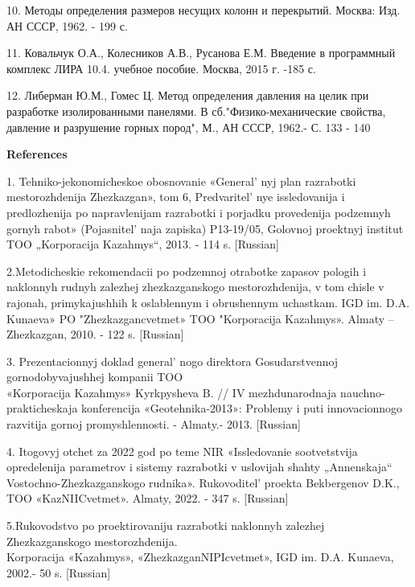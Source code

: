 \begin{references}
10. Методы определения размеров несущих колонн и перекрытий. Москва:
Изд. АН СССР, 1962. - 199 с.

11. Ковальчук О.А., Колесников А.В., Русанова Е.М. Введение в
программный комплекс ЛИРА 10.4. учебное пособие. Москва, 2015 г. -185 с.

12. Либерман Ю.М., Гомес Ц. Метод определения давления на целик при
разработке изолированными панелями. В сб."Физико-механические свойства,
давление и разрушение горных пород", М., АН СССР, 1962.- С. 133 - 140
\end{references}

\begin{center}
{\bfseries References}
\end{center}

\begin{references}

1. Tehniko-jekonomicheskoe obosnovanie «General' nyj plan
razrabotki mestorozhdenija Zhezkazgan», tom 6,
Predvaritel' nye issledovanija i predlozhenija po
napravlenijam razrabotki i porjadku provedenija podzemnyh gornyh rabot»
(Pojasnitel' naja zapiska) P13-19/05, Golovnoj proektnyj
institut TOO „Korporacija Kazahmys``, 2013. - 114 s. {[}Russian{]}

2.Metodicheskie rekomendacii po podzemnoj otrabotke zapasov pologih i
naklonnyh rudnyh zalezhej zhezkazganskogo mestorozhdenija, v tom chisle
v rajonah, primykajushhih k oslablennym i obrushennym uchastkam. IGD im.
D.A. Kunaeva» PO "Zhezkazgancvetmet» TOO "Korporacija Kazahmys». Almaty
-- Zhezkazgan, 2010. - 122 s. {[}Russian{]}

3. Prezentacionnyj doklad general' nogo direktora
Gosudarstvennoj gornodobyvajushhej kompanii TOO \\«Korporacija Kazahmys»
Kyrkpysheva B. // IV mezhdunarodnaja nauchno-prakticheskaja konferencija
«Geotehnika-2013»: Problemy i puti innovacionnogo razvitija gornoj
promyshlennosti. - Almaty.- 2013. {[}Russian{]}

4. Itogovyj otchet za 2022 god po teme NIR «Issledovanie sootvetstvija
opredelenija parametrov i sistemy razrabotki v uslovijah shahty
„Annenskaja`` Vostochno-Zhezkazganskogo rudnika».
Rukovoditel'{} proekta Bekbergenov D.K., TOO
«KazNIICvetmet». Almaty, 2022. - 347 s. {[}Russian{]}

5.Rukovodstvo po proektirovaniju razrabotki naklonnyh zalezhej
Zhezkazganskogo mestorozhdenija.\\ Korporacija «Kazahmys»,
«ZhezkazganNIPIcvetmet», IGD im. D.A. Kunaeva, 2002.- 50 s.
{[}Russian{]}


\end{references}
